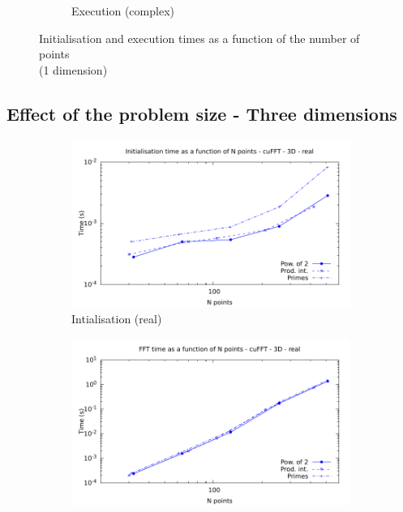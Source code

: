 \documentclass[12pt, a4paper]{article}
\begin{document}
\begin{figure}[H]
\begin{subfigure}{.5\textwidth}
\caption{Execution (complex)}
\label{FFT1DCE}
\end{subfigure}
\caption{Initialisation and execution times as a function of the number of points\\(1 dimension)}
\label{FFT1D}
\end{figure}







\subsection{Effect of the problem size - Three dimensions}

\begin{figure}[H]
\captionsetup{width=0.8\linewidth}
\centering
\begin{subfigure}{.5\textwidth}
\centering
\includegraphics[width=.9\linewidth]{graphs/fft-cuda-3d-pow2-r-init.pdf}
\caption{Intialisation (real)}
\label{FFTCUDA1DRI}
\end{subfigure}%
\begin{subfigure}{.5\textwidth}
\centering
\includegraphics[width=.9\linewidth]{graphs/fft-cuda-3d-pow2-r-exec.pdf}

\end{subfigure}
\end{figure}
\end{document}
